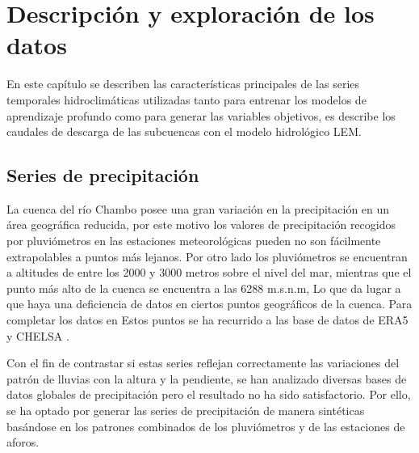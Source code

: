 \chapter{Descripción y exploración de los datos}
\label{capitulo 1}


En este capítulo se describen las características principales de las series temporales hidroclimáticas utilizadas 
tanto para entrenar los modelos de aprendizaje profundo como para generar las variables objetivos, es describe
los caudales de descarga de las subcuencas con el modelo hidrológico LEM.



\section{Series de precipitación}


La cuenca del río Chambo posee una gran variación en la precipitación en un área geográfica reducida,
por este motivo los valores de precipitación recogidos por pluviómetros en las estaciones meteorológicas 
pueden no son fácilmente extrapolables a puntos más lejanos. Por otro lado los pluviómetros se encuentran 
a altitudes de entre los 2000 y 3000 metros sobre el nivel del mar, mientras que el punto más alto de la cuenca se encuentra a las 6288 m.s.n.m,
Lo que da lugar a que haya una deficiencia de datos en ciertos puntos geográficos de la cuenca. Para completar los datos en Estos
puntos se ha recurrido a las base de datos de ERA5 \cite{ERA5} y CHELSA \cite{CHELSA}.


Con el fin de contrastar si estas series reflejan 
correctamente las variaciones del patrón de lluvias con la altura y la pendiente, 
se han analizado diversas bases de datos globales de precipitación pero el resultado no ha sido 
satisfactorio.  Por ello, se ha optado por generar las series de precipitación de manera sintéticas basándose 
en los patrones combinados de los pluviómetros y de las estaciones de aforos.




